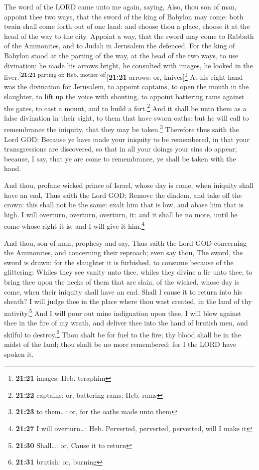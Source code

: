  The word of the LORD came unto me again, saying,
 Also, thou son of man, appoint thee two ways, that the
sword of the king of Babylon may come: both twain shall come forth out
of one land: and choose thou a place, choose it at the head of the way
to the city.  Appoint a way, that the sword may come to
Rabbath of the Ammonites, and to Judah in Jerusalem the defenced.
 For the king of Babylon stood at the parting of the way,
at the head of the two ways, to use divination: he made his arrows
bright, he consulted with images, he looked in the
liver.\textsuperscript{{[}\textbf{21:21} parting of: Heb. mother
of{]}}{[}\textbf{21:21} arrows: or, knives{]}\footnote{\textbf{21:21}
  images: Heb. teraphim}  At his right hand was the
divination for Jerusalem, to appoint captains, to open the mouth in the
slaughter, to lift up the voice with shouting, to appoint battering rams
against the gates, to cast a mount, and to build a fort.\footnote{\textbf{21:22}
  captains: or, battering rams: Heb. rams}  And it shall
be unto them as a false divination in their sight, to them that have
sworn oaths: but he will call to remembrance the iniquity, that they may
be taken.\footnote{\textbf{21:23} to them\ldots: or, for the oaths made
  unto them}  Therefore thus saith the Lord GOD; Because
ye have made your iniquity to be remembered, in that your transgressions
are discovered, so that in all your doings your sins do appear; because,
I say, that ye are come to remembrance, ye shall be taken with the hand.

 And thou, profane wicked prince of Israel, whose day is
come, when iniquity shall have an end,  Thus saith the
Lord GOD; Remove the diadem, and take off the crown: this shall not be
the same: exalt him that is low, and abase him that is high.
 I will overturn, overturn, overturn, it: and it shall be
no more, until he come whose right it is; and I will give it
him.\footnote{\textbf{21:27} I will overturn\ldots: Heb. Perverted,
  perverted, perverted, will I make it}

 And thou, son of man, prophesy and say, Thus saith the
Lord GOD concerning the Ammonites, and concerning their reproach; even
say thou, The sword, the sword is drawn: for the slaughter it is
furbished, to consume because of the glittering:  Whiles
they see vanity unto thee, whiles they divine a lie unto thee, to bring
thee upon the necks of them that are slain, of the wicked, whose day is
come, when their iniquity shall have an end.  Shall I
cause it to return into his sheath? I will judge thee in the place where
thou wast created, in the land of thy nativity.\footnote{\textbf{21:30}
  Shall\ldots: or, Cause it to return}  And I will pour
out mine indignation upon thee, I will blow against thee in the fire of
my wrath, and deliver thee into the hand of brutish men, and skilful to
destroy.\footnote{\textbf{21:31} brutish: or, burning} 
Thou shalt be for fuel to the fire; thy blood shall be in the midst of
the land; thou shalt be no more remembered: for I the LORD have spoken
it.

